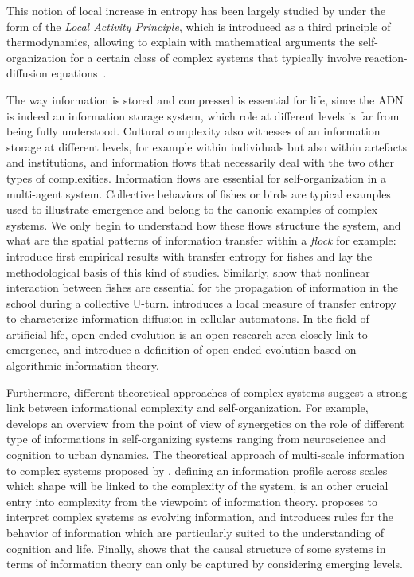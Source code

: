 This notion of local increase in entropy has been largely studied by  under the form of the \emph{Local Activity Principle}, which is introduced as a third principle of thermodynamics, allowing to explain with mathematical arguments the self-organization for a certain class of complex systems that typically involve reaction-diffusion equations~\cite{mainzer2013local}.


The way information is stored and compressed is essential for life, since the ADN is indeed an information storage system, which role at different levels is far from being fully understood. Cultural complexity also witnesses of an information storage at different levels, for example within individuals but also within artefacts and institutions, and information flows that necessarily deal with the two other types of complexities. Information flows are essential for self-organization in a multi-agent system. Collective behaviors of fishes or birds are typical examples used to illustrate emergence and belong to the canonic examples of complex systems. We only begin to understand how these flows structure the system, and what are the spatial patterns of information transfer within a \emph{flock} for example: \cite{crosato2017informative} introduce first empirical results with transfer entropy for fishes and lay the methodological basis of this kind of studies. Similarly, \cite{lecheval2018social} show that nonlinear interaction between fishes are essential for the propagation of information in the school during a collective U-turn. \cite{lizier2008local} introduces a local measure of transfer entropy to characterize information diffusion in cellular automatons. In the field of artificial life, open-ended evolution is an open research area closely link to emergence, and \cite{corominas2018zipf} introduce a definition of open-ended evolution based on algorithmic information theory.

Furthermore, different theoretical approaches of complex systems suggest a strong link between informational complexity and self-organization. For example, \cite{e18060197} develops an overview from the point of view of synergetics on the role of different type of informations in self-organizing systems ranging from neuroscience and cognition to urban dynamics. The theoretical approach of multi-scale information to complex systems proposed by \cite{allen2017multiscale}, defining an information profile across scales which shape will be linked to the complexity of the system, is an other crucial entry into complexity from the viewpoint of information theory. \cite{gershenson2012world} proposes to interpret complex systems as evolving information, and introduces rules for the behavior of information which are particularly suited to the understanding of cognition and life. Finally, \cite{hoel2017map} shows that the causal structure of some systems in terms of information theory can only be captured by considering emerging levels.




